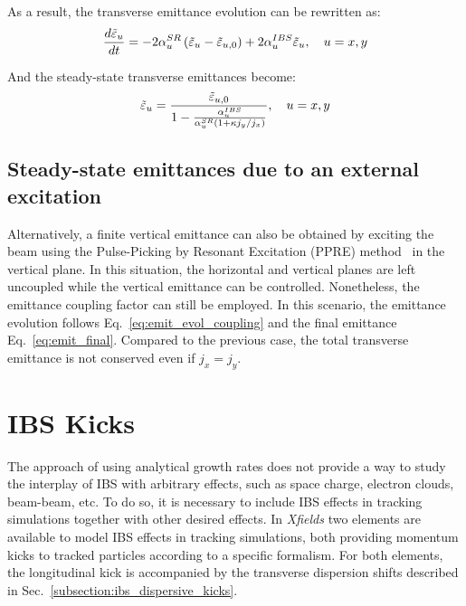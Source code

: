 As a result, the transverse emittance evolution can be rewritten as:
\begin{equation}
\frac{d\Tilde{\varepsilon}_u}{dt} = -2 \alpha^{SR}_u \left(\Tilde{\varepsilon}_u - \Tilde{\varepsilon}_{u,0}\right) + 2 \alpha^{IBS}_u \Tilde{\varepsilon}_u, \quad u = x,y
\label{eq:emit_evol_coupling}
\end{equation}

And the steady-state transverse emittances become:
\begin{equation}
    \Tilde{\varepsilon}_u = \frac{\Tilde{\varepsilon}_{u,0}}{1 - \frac{\alpha^{IBS}_u}{\alpha^{SR}_u \left(1 + \kappa j_y / j_x \right)}}, \quad u = x,y
\label{eq:emit_final_coupling}
\end{equation}


\subsection{Steady-state emittances due to an external excitation}

Alternatively, a finite vertical emittance can also be obtained by exciting the beam using the Pulse-Picking by Resonant Excitation (PPRE) method~\cite{Hwang2019AnalyticalAN} in the vertical plane.
In this situation, the horizontal and vertical planes are left uncoupled while the vertical emittance can be controlled. Nonetheless, the emittance coupling factor can still be employed. 
In this scenario, the emittance evolution follows Eq.~\eqref{eq:emit_evol_coupling} and the final emittance Eq.~\eqref{eq:emit_final}. Compared to the previous case, the total transverse emittance is not conserved even if $j_x = j_y$.

\section{IBS Kicks}
\label{section:ibs_kicks}

The approach of using analytical growth rates does not provide a way to study the interplay of IBS with arbitrary effects, such as space charge, electron clouds, beam-beam, etc.
To do so, it is necessary to include IBS effects in tracking simulations together with other desired effects.
In \textit{Xfields} two elements are available to model IBS effects in tracking simulations, both providing momentum kicks to tracked particles according to a specific formalism.
For both elements, the longitudinal kick is accompanied by the transverse
dispersion shifts described in Sec.~\ref{subsection:ibs_dispersive_kicks}.

